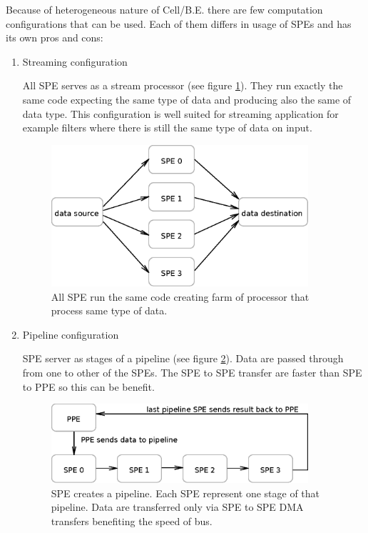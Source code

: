 \par
Because of heterogeneous nature of \mbox{Cell/B.E.} there are few computation configurations that can be used.
Each of them differs in usage of SPEs and has its own pros and cons:
\begin{enumerate}
\item Streaming configuration
\par
All SPE serves as a stream processor (see figure \ref{fg:streamingModel}).
They run exactly the same code expecting the same type of data and producing also the same of data type.
This configuration is well suited for streaming application for example filters where there is still the same type of data on input.

\begin{figure}
    \centering
    \includegraphics[width=0.9\textwidth]{data/streamingModel}
    \caption[Streaming SPE configuration]{All SPE run the same code creating farm of processor that process same type of data.}
    \label{fg:streamingModel}
\end{figure}

\item Pipeline configuration
\par
SPE server as stages of a pipeline (see figure \ref{fg:pipelineModel}).
Data are passed through from one to other of the SPEs.
The SPE to SPE transfer are faster than SPE to PPE so this can be benefit.

\begin{figure}
    \centering
    \includegraphics[width=0.9\textwidth]{data/pipelineModel}
    \caption[Pipeline SPE configuration]{SPE creates a pipeline. Each SPE represent one stage of that pipeline. Data are transferred only via SPE to SPE DMA transfers benefiting the speed of bus.}
    \label{fg:pipelineModel}
\end{figure}


\end{enumerate}
